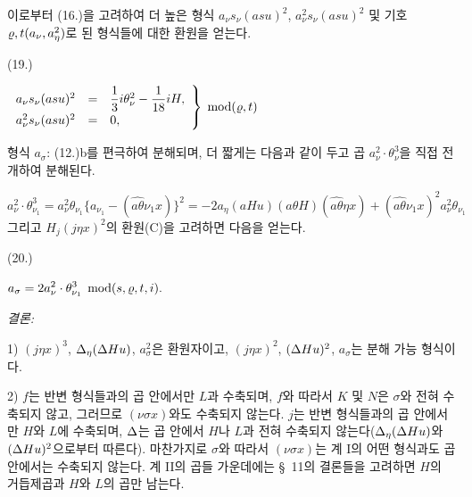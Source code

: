 이로부터 (16.)을 고려하여 더 높은 형식 $a_\nu s_\nu(asu)^2$, $a_\nu^2s_\nu(asu)^2$ 및 기호 $\varrho,t(a_\nu,a_\eta^2)$로 된 형식들에 대한 환원을 얻는다.
\par\smallskip\noindent
\begin{minipage}[c]{4.8em}
\centering (19.)
\end{minipage}%
\begin{minipage}[c]{\dimexpr\linewidth-4.8em\relax}
\centering
\(\displaystyle
\left.\begin{array}{rcl}
a_\nu s_\nu(asu)^2&=&\dfrac13 i\theta_\nu^2-\dfrac1{18}iH,\\[0.5em]
a_\nu^2s_\nu(asu)^2&=&0,
\end{array}\right\}\;\operatorname{mod} (\varrho,t)
\)
\end{minipage}
\par\smallskip
형식 $a_\sigma$: (12.)b를 편극하여 분해되며, 더 짧게는 다음과 같이 두고 곱 $a_\nu^2\cdot\theta_\nu^3$을 직접 전개하여 분해된다.

\[
a_\nu^2\cdot\theta_{\nu_1}^3=a_\nu^2\theta_{\nu_1}\{a_{\nu_1}-(\widehat{a\theta}\nu_1x)\}^2
=-2a_\eta(aHu)(a\theta H)(\widehat{a\theta}\eta x)+(\widehat{a\theta}\nu_1x)^2a_\nu^2\theta_{\nu_1}
\]
그리고 $H_j(j\eta x)^2$의 환원(C)을 고려하면 다음을 얻는다.
\par\smallskip\noindent
\begin{minipage}[c]{4.8em}
\centering (20.)
\end{minipage}%
\begin{minipage}[c]{\dimexpr\linewidth-4.8em\relax}
\centering
\(\displaystyle a_\sigma=2a_\nu^2\cdot\theta_{\nu_1}^3\;\operatorname{mod} (s,\varrho,t,i).\)
\end{minipage}
\par\smallskip

\noindent\emph{결론:}

1) $(j\eta x)^3$, $\Delta_\eta(\Delta Hu)$, $a_\sigma^2$은 환원자이고, $(j\eta x)^2$, $(\Delta Hu)^2$, $a_\sigma$는 분해 가능 형식이다.

2) $f$는 반변 형식들과의 곱 안에서만 $L$과 수축되며, $f$와 따라서 $K$ 및 $N$은 $\sigma$와 전혀 수축되지 않고, 그러므로 $(\nu\sigma x)$와도 수축되지 않는다. $j$는 반변 형식들과의 곱 안에서만 $H$와 $L$에 수축되며, $\Delta$는 곱 안에서 $H$나 $L$과 전혀 수축되지 않는다($\Delta_\eta(\Delta Hu)$와 $(\Delta Hu)^2$으로부터 따른다). 마찬가지로 $\sigma$와 따라서 $(\nu\sigma x)$는 계 I의 어떤 형식과도 곱 안에서는 수축되지 않는다. 계 II의 곱들 가운데에는 \S\ 11의 결론들을 고려하면 $H$의 거듭제곱과 $H$와 $L$의 곱만 남는다.

